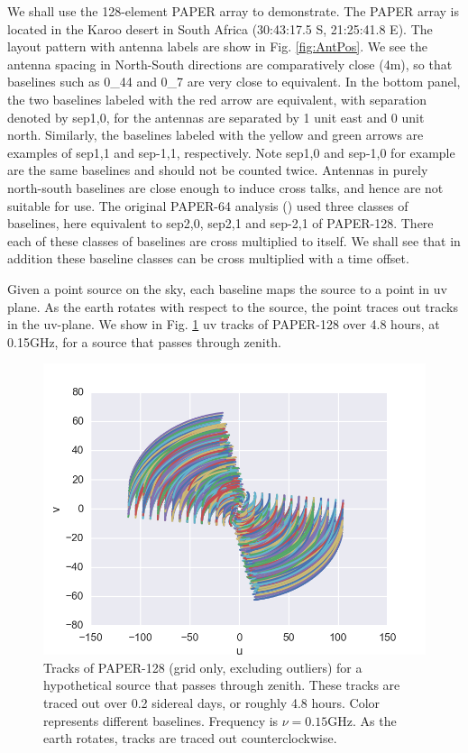 \documentclass[preprint2,numberedappendix,tighten,twocolappendix]{aastex6}  %
\renewcommand\[{\begin{equation}}
\renewcommand\]{\end{equation}}
\begin{document}
We shall use the 128-element PAPER array to demonstrate. 
The PAPER array is located in the Karoo desert in South Africa (30:43:17.5
S, 21:25:41.8 E). The layout pattern with antenna labels are show
in Fig. \ref{fig:AntPos}. We see the antenna spacing in North-South
directions are comparatively close (4m), so that baselines such as
0\_44 and 0\_7 are very close to equivalent. In the bottom panel,
the two baselines labeled with the red arrow are equivalent, with
separation denoted by sep1,0, for the antennas are separated by 1
unit east and 0 unit north. Similarly, the baselines labeled with
the yellow and green arrows are examples of sep1,1 and sep-1,1, respectively.
Note sep1,0 and sep-1,0 for example are the same baselines and should
not be counted twice. Antennas in purely north-south baselines
are close enough to induce cross talks, and hence are not suitable
for use. The original PAPER-64 analysis (\cite{Ali2015}) used three classes of baselines, here
equivalent to 
sep2,0, sep2,1 and sep-2,1 \cite{Ali2015} of PAPER-128. There each of these classes
of baselines are cross multiplied to itself. We shall see that in addition these
baseline classes can be cross multiplied with a time offset.


Given a point source on the sky, each baseline maps the
source to a point in uv plane. As the earth rotates with respect to
the source, the point traces out tracks in the uv-plane. 
We show in Fig. \ref{fig:Tracks} uv tracks of PAPER-128 over 4.8 hours, at 0.15GHz, for a source that passes through zenith. 


\begin{figure}[H]
\includegraphics[width=\linewidth]{tracks128}
\caption{Tracks of PAPER-128 (grid only, excluding outliers) for a hypothetical source that passes through zenith.
These tracks are traced out over 0.2 sidereal days, or roughly 4.8
hours. Color represents different baselines. Frequency is $\nu=0.15\text{GHz}$.
As the earth rotates, tracks are traced out counterclockwise. \label{fig:Tracks}}
\end{figure}
\end{document}
